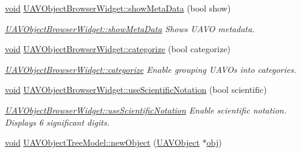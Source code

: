 \begin{DoxyCompactItemize}
\item 
\hyperlink{group___u_a_v_objects_plugin_ga444cf2ff3f0ecbe028adce838d373f5c}{void} \hyperlink{group___u_a_v_object_browser_plugin_ga96e35f04d563b34d393bcd810423910d}{U\-A\-V\-Object\-Browser\-Widget\-::show\-Meta\-Data} (bool show)
\begin{DoxyCompactList}\small\item\em \hyperlink{group___u_a_v_object_browser_plugin_ga96e35f04d563b34d393bcd810423910d}{U\-A\-V\-Object\-Browser\-Widget\-::show\-Meta\-Data} Shows U\-A\-V\-O metadata. \end{DoxyCompactList}\item 
\hyperlink{group___u_a_v_objects_plugin_ga444cf2ff3f0ecbe028adce838d373f5c}{void} \hyperlink{group___u_a_v_object_browser_plugin_gaf58df81be827bdbeed97dcb96dcfbb6a}{U\-A\-V\-Object\-Browser\-Widget\-::categorize} (bool categorize)
\begin{DoxyCompactList}\small\item\em \hyperlink{group___u_a_v_object_browser_plugin_gaf58df81be827bdbeed97dcb96dcfbb6a}{U\-A\-V\-Object\-Browser\-Widget\-::categorize} Enable grouping U\-A\-V\-Os into categories. \end{DoxyCompactList}\item 
\hyperlink{group___u_a_v_objects_plugin_ga444cf2ff3f0ecbe028adce838d373f5c}{void} \hyperlink{group___u_a_v_object_browser_plugin_gaf9528641294317e651ef6e23f6e11946}{U\-A\-V\-Object\-Browser\-Widget\-::use\-Scientific\-Notation} (bool scientific)
\begin{DoxyCompactList}\small\item\em \hyperlink{group___u_a_v_object_browser_plugin_gaf9528641294317e651ef6e23f6e11946}{U\-A\-V\-Object\-Browser\-Widget\-::use\-Scientific\-Notation} Enable scientific notation. Displays 6 significant digits. \end{DoxyCompactList}\item 
\hyperlink{group___u_a_v_objects_plugin_ga444cf2ff3f0ecbe028adce838d373f5c}{void} \hyperlink{group___u_a_v_object_browser_plugin_gafd9deb057c76e2910dd13055abcbad3e}{U\-A\-V\-Object\-Tree\-Model\-::new\-Object} (\hyperlink{class_u_a_v_object}{U\-A\-V\-Object} $\ast$\hyperlink{glext_8h_a0c0d4701a6c89f4f7f0640715d27ab26}{obj})
\end{DoxyCompactItemize}

